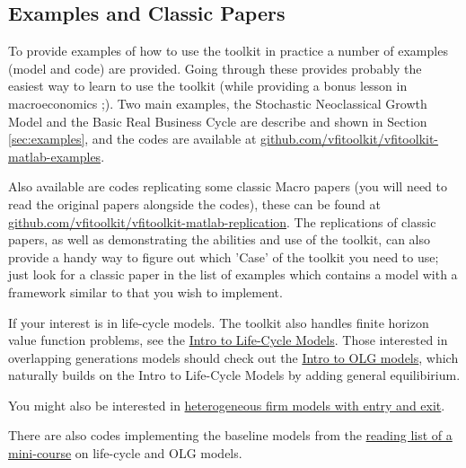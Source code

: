 \documentclass[11pt,fleqn]{article}
\begin{document}
\subsection{Examples and Classic Papers}
To provide examples of how to use the toolkit in practice a number of examples (model and code) are provided. Going through these provides probably the easiest way to learn to use the toolkit (while providing a bonus lesson in macroeconomics ;). Two main examples, the Stochastic Neoclassical Growth Model
and the Basic Real Business Cycle are describe and shown in Section \ref{sec:examples}, and the codes are available at \href{https://github.com/vfitoolkit/vfitoolkit-matlab-examples}{github.com/vfitoolkit/vfitoolkit-matlab-examples}.


Also available are codes replicating some classic Macro papers (you will need to read the original papers alongside the codes), these can be found at
\href{https://github.com/vfitoolkit/vfitoolkit-matlab-replication}{github.com/vfitoolkit/vfitoolkit-matlab-replication}.
The replications of classic papers, as well as demonstrating the abilities and use of the toolkit, can also provide a handy way to figure out which 'Case' of the toolkit you need to use; just look for a classic paper in the list of examples which contains a model with a framework similar to that you wish to implement.

If your interest is in life-cycle models. The toolkit also handles finite horizon value function problems, see the \href{https://www.vfitoolkit.com/updates-blog/2021/an-introduction-to-life-cycle-models/}{Intro to Life-Cycle Models}.
Those interested in overlapping generations models should check out the \href{https://www.vfitoolkit.com/updates-blog/2022/an-introduction-to-olg-models/}{Intro to OLG models}, which naturally builds on the Intro to Life-Cycle Models by adding general equilibirium.

You might also be interested in \href{https://www.vfitoolkit.com/updates-blog/2020/entry-exit-example-based-on-hopenhayn-rogerson-1993/}{heterogeneous firm models with entry and exit}.

There are also codes implementing the baseline models from the \href{https://github.com/robertdkirkby/LifeCycleOLGReadingList}{reading list of a mini-course} on life-cycle and OLG models.
\end{document}
